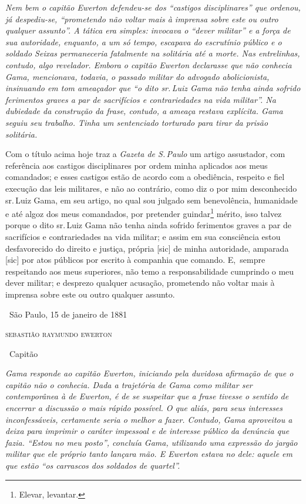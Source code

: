 {\begin{resumo}
\emph{Nem bem o capitão Ewerton defendeu-se dos ``castigos disciplinares''
que ordenou, já despediu-se, ``prometendo não voltar mais à imprensa
sobre este ou outro qualquer assunto''. A tática era simples: invocava o
``dever militar'' e a força de sua autoridade, enquanto, a um só tempo,
escapava do escrutínio público e o soldado Seixas permaneceria
fatalmente na solitária até a morte. Nas entrelinhas, contudo, algo
revelador. Embora o capitão Ewerton declarasse que não conhecia Gama,
mencionava, todavia, o passado militar do advogado abolicionista,
insinuando em tom ameaçador que ``o dito sr.\,Luiz Gama não tenha ainda
sofrido ferimentos graves a par de sacrifícios e contrariedades na vida
militar''. Na dubiedade da construção da frase, contudo, a ameaça restava
explícita. Gama seguiu seu trabalho. Tinha um sentenciado torturado para
tirar da prisão solitária. }
\end{resumo}

Com o título acima hoje traz a \emph{Gazeta de S.\,Paulo} um artigo
assustador, com referência aos castigos disciplinares por ordem minha
aplicados aos meus comandados; e esses castigos estão de acordo com a
obediência, respeito e fiel execução das leis militares, e não ao
contrário, como diz o por mim desconhecido sr.\,Luiz Gama, em seu artigo,
no qual sou julgado sem benevolência, humanidade e até algoz dos meus
comandados, por pretender guindar\footnote{Elevar, levantar.}
mérito, isso talvez porque
o dito sr.\,Luiz Gama não tenha ainda sofrido ferimentos graves a par de
sacrifícios e contrariedades na vida militar; e assim em sua consciência
estou desfavorecido do direito e justiça, própria {[}sic{]} de minha
autoridade, amparada {[}sic{]} por atos públicos por escrito à companhia
que comando. E,~sempre respeitando aos meus superiores, não temo a
responsabilidade cumprindo o meu dever militar; e desprezo qualquer
acusação, prometendo não voltar mais à imprensa sobre este ou outro
qualquer assunto.

\medskip
\hfill\ São Paulo, 15 de janeiro de 1881

\hfill\textsc{sebastião raymundo ewerton}

\hfill\ Capitão


\begin{resumo}
\emph{Gama responde ao capitão Ewerton, iniciando pela duvidosa
afirmação de que o capitão não o conhecia. Dada a trajetória de Gama
como militar ser contemporânea à de Ewerton, é de se suspeitar que a
frase tivesse o sentido de encerrar a discussão o mais rápido possível.
O que aliás, para seus interesses inconfessáveis, certamente seria o
melhor a fazer. Contudo, Gama aproveitou a deixa para imprimir o caráter
impessoal e de interesse público da denúncia que fazia. ``Estou no meu
posto'', concluía Gama, utilizando uma expressão do jargão militar que
ele próprio tanto lançara mão. E Ewerton estava no dele: aquele em que
estão ``os carrascos dos soldados de quartel''. }
\end{resumo}

}

